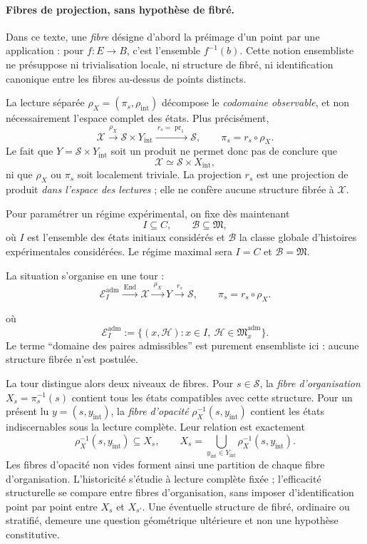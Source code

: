 \documentclass[11pt,a4paper]{article}
\theoremstyle{definition}
\theoremstyle{remark}
\newcommand{\X}{\mathcal X}
\newcommand{\Sstruct}{\mathcal S}
\newcommand{\M}{\mathfrak M}
\newcommand{\Madm}{\mathfrak M^{\mathrm{adm}}}
\newcommand{\End}{\operatorname{End}}
\begin{document}
\paragraph{Fibres de projection, sans hypothèse de fibré.}
Dans ce texte, une \emph{fibre} désigne d'abord la préimage d'un point par une application : pour $f:E\to B$, c'est l'ensemble $f^{-1}(b)$. Cette notion ensembliste ne présuppose ni trivialisation locale, ni structure de fibré, ni identification canonique entre les fibres au-dessus de points distincts.

La lecture séparée $\rho_X=(\pi_s,\rho_{\mathrm{int}})$ décompose le \emph{codomaine observable}, et non nécessairement l'espace complet des états. Plus précisément,
\[
\X\xrightarrow{\rho_X}\Sstruct\times Y_{\mathrm{int}}
\xrightarrow{\ r_s=\operatorname{pr}_1\ }\Sstruct,
\qquad \pi_s=r_s\circ\rho_X.
\]
Le fait que $Y=\Sstruct\times Y_{\mathrm{int}}$ soit un produit ne permet donc pas de conclure que
\[
\X\simeq\Sstruct\times X_{\mathrm{int}},
\]
ni que $\rho_X$ ou $\pi_s$ soit localement triviale. La projection $r_s$ est une projection de produit \emph{dans l'espace des lectures} ; elle ne confère aucune structure fibrée à $\X$.

Pour paramétrer un régime expérimental, on fixe dès maintenant
\[
\boxed{I\subseteq C,\qquad \mathcal B\subseteq\M,}
\]
où $I$ est l'ensemble des états initiaux considérés et $\mathcal B$ la classe globale d'histoires expérimentales considérées. Le régime maximal sera $I=C$ et $\mathcal B=\M$.

La situation s'organise en une tour :
\[
\boxed{
\mathcal E_I^{\mathrm{adm}}\xrightarrow{\ \End\ }\X
\xrightarrow{\ \rho_X\ }Y
\xrightarrow{\ r_s\ }\Sstruct,
\qquad \pi_s=r_s\circ\rho_X .}
\]

où
\[
\mathcal E_I^{\mathrm{adm}}:=\{(x,\mathcal H):x\in I,\ \mathcal H\in\Madm_x\}.
\]
Le terme ``domaine des paires admissibles'' est purement ensembliste ici : aucune structure fibrée n'est postulée.

La tour distingue alors deux niveaux de fibres. Pour $s\in\Sstruct$, la \emph{fibre d'organisation}
$X_s=\pi_s^{-1}(s)$ contient tous les états compatibles avec cette structure. Pour un présent lu $y=(s,y_{\mathrm{int}})$, la \emph{fibre d'opacité} $\rho_X^{-1}(s,y_{\mathrm{int}})$ contient les états indiscernables sous la lecture complète. Leur relation est exactement
\[
\boxed{
\rho_X^{-1}(s,y_{\mathrm{int}})\subseteq X_s,
\qquad
X_s=\bigcup_{y_{\mathrm{int}}\in Y_{\mathrm{int}}}
\rho_X^{-1}(s,y_{\mathrm{int}}).
}
\]
Les fibres d'opacité non vides forment ainsi une partition de chaque fibre d'organisation. L'historicité s'étudie à lecture complète fixée ; l'efficacité structurelle se compare entre fibres d'organisation, sans imposer d'identification point par point entre $X_s$ et $X_{s'}$. Une éventuelle structure de fibré, ordinaire ou stratifié, demeure une question géométrique ultérieure et non une hypothèse constitutive.
\end{document}
